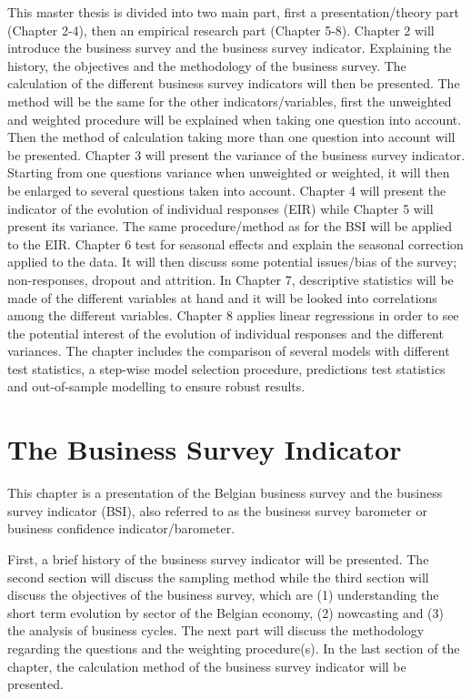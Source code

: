 \documentclass[12pt,a4paper,oneside]{book}
\begin{document}
This master thesis is divided into two main part, first a presentation/theory part (Chapter 2-4), then an empirical research part (Chapter 5-8).
Chapter 2 will introduce the business survey and the business survey indicator. Explaining the history, the objectives and the methodology of the business survey. The calculation of the different business survey indicators will then be presented. The method will be the same for the other indicators/variables, first the unweighted and weighted procedure will be explained when taking one question into account. Then the method of calculation taking more than one question into account will be presented.
Chapter 3 will present the variance of the business survey indicator. Starting from one questions variance when unweighted or weighted, it will then be enlarged to several questions taken into account.
Chapter 4 will present the indicator of the evolution of individual responses (EIR) while Chapter 5 will present its variance. The same procedure/method as for the BSI will be applied to the EIR.
Chapter 6 test for seasonal effects and explain the seasonal correction applied to the data. It will then discuss some potential issues/bias of the survey; non-responses, dropout and attrition.
In Chapter 7, descriptive statistics will be made of the different variables at hand and it will be looked into correlations among the different variables.
Chapter 8 applies linear regressions in order to see the potential interest of the evolution of individual responses and the different variances. 
The chapter includes the comparison of several models with different test statistics, a step-wise model selection procedure, predictions test statistics and out-of-sample modelling to ensure robust results.


\chapter{The Business Survey Indicator}

This chapter is a presentation of the Belgian business survey and the business survey indicator (BSI), also referred to as the business survey barometer or business confidence indicator/barometer.

First, a brief history of the business survey indicator will be presented.
The second section will discuss the sampling method while the third section will discuss the objectives of the business survey, which are (1) understanding the short term evolution by sector of the Belgian economy, (2) nowcasting and (3) the analysis of business cycles.
The next part will discuss the methodology regarding the questions and the weighting procedure(s).
In the last section of the chapter, the calculation method of the business survey indicator will be presented.
\end{document}
